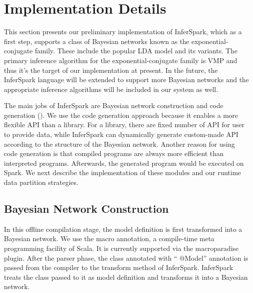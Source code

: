 \section{Implementation Details}
\label{sec:implementation}
This section presents our preliminary implementation of InferSpark, which
as a first step, supports a class of Bayesian networks known as the 
exponential-conjugate family. These include the popular LDA model and its
variants. The primary inference algorithm for the exponential-conjugate family
is VMP and thus it's the target of our implementation at present.
In the future, the InferSpark language will be extended to support more Bayesian
networks and the appropriate inference algorithms will be included in our system
as well.

The main jobs of InferSpark are Bayesian network construction and 
code generation (). 
We use the code generation approach because it enables a more flexible API
than a library. For a library, there are fixed number of API for user to
provide data, while InferSpark can dynamically generate custom-made API 
according to the structure of the Bayesian network. 
Another reason for using code generation is
that compiled programs are always more efficient than interpreted programs.
Afterwards, the generated program would be executed on Spark.
We next describe the implementation of
these modules and our runtime data partition strategies.

\subsection{Bayesian Network Construction}\label{sec:bnc}

In this offline compilation stage, the model definition is first transformed
into a Bayesian network.  We use the macro annotation, a compile-time meta
programming facility of Scala.  It is currently supported via the
macroparadise plugin. After the parser phase, the class annotated with ``{\sf
@Model}'' annotation is passed from the compiler to the transform method of
InferSpark. InferSpark treats the class passed to it as model definition and
transforms it into a Bayesian network.

